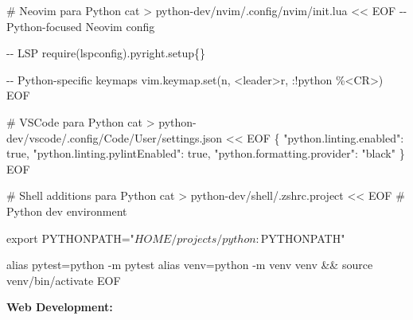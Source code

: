 \documentclass[
  doc,
  floatsintext,
  longtable,
  a4paper,
  nolmodern,
  notxfonts,
  notimes,
  12pt,
  colorlinks=true,linkcolor=blue,citecolor=blue,urlcolor=blue]{apa7}
\newenvironment{Shaded}{\begin{snugshade}}{\end{snugshade}}
\newcommand{\CommentTok}[1]{\textcolor[rgb]{0.37,0.37,0.37}{#1}}
\newcommand{\FunctionTok}[1]{\textcolor[rgb]{0.28,0.35,0.67}{#1}}
\newcommand{\NormalTok}[1]{\textcolor[rgb]{0.00,0.23,0.31}{#1}}
\newcommand{\OperatorTok}[1]{\textcolor[rgb]{0.37,0.37,0.37}{#1}}
\newcommand{\StringTok}[1]{\textcolor[rgb]{0.13,0.47,0.30}{#1}}
\begin{document}
\begin{Shaded}
\begin{Highlighting}[]
\CommentTok{\# Neovim para Python}
\FunctionTok{cat} \OperatorTok{\textgreater{}}\NormalTok{ python{-}dev/nvim/.config/nvim/init.lua }\OperatorTok{\textless{}\textless{} \textquotesingle{}EOF\textquotesingle{}}
\StringTok{{-}{-} Python{-}focused Neovim config}

\StringTok{{-}{-} LSP}
\StringTok{require(\textquotesingle{}lspconfig\textquotesingle{}).pyright.setup\{\}}

\StringTok{{-}{-} Python{-}specific keymaps}
\StringTok{vim.keymap.set(\textquotesingle{}n\textquotesingle{}, \textquotesingle{}\textless{}leader\textgreater{}r\textquotesingle{}, \textquotesingle{}:!python \%\textless{}CR\textgreater{}\textquotesingle{})}
\OperatorTok{EOF}

\CommentTok{\# VSCode para Python}
\FunctionTok{cat} \OperatorTok{\textgreater{}}\NormalTok{ python{-}dev/vscode/.config/Code/User/settings.json }\OperatorTok{\textless{}\textless{} \textquotesingle{}EOF\textquotesingle{}}
\StringTok{\{}
\StringTok{    "python.linting.enabled": true,}
\StringTok{    "python.linting.pylintEnabled": true,}
\StringTok{    "python.formatting.provider": "black"}
\StringTok{\}}
\OperatorTok{EOF}

\CommentTok{\# Shell additions para Python}
\FunctionTok{cat} \OperatorTok{\textgreater{}}\NormalTok{ python{-}dev/shell/.zshrc.project }\OperatorTok{\textless{}\textless{} \textquotesingle{}EOF\textquotesingle{}}
\StringTok{\# Python dev environment}

\StringTok{export PYTHONPATH="$HOME/projects/python:$PYTHONPATH"}

\StringTok{alias pytest=\textquotesingle{}python {-}m pytest\textquotesingle{}}
\StringTok{alias venv=\textquotesingle{}python {-}m venv venv \&\& source venv/bin/activate\textquotesingle{}}
\OperatorTok{EOF}
\end{Highlighting}
\end{Shaded}

\textbf{Web Development:}
\end{document}
